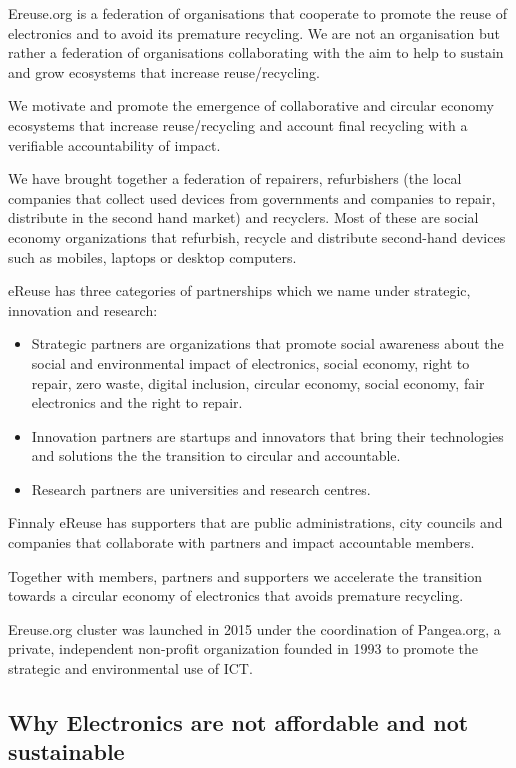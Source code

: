 \documentclass[
]{book}
\begin{document}
Ereuse.org is a federation of organisations that cooperate to promote the reuse of electronics and to avoid its premature recycling. We are not an organisation but rather a federation of organisations collaborating with the aim to help to sustain and grow ecosystems that increase reuse/recycling.

We motivate and promote the emergence of collaborative and circular economy ecosystems that increase reuse/recycling and account final recycling with a verifiable accountability of impact.

We have brought together a federation of repairers, refurbishers (the local companies that collect used devices from governments and companies to repair, distribute in the second hand market) and recyclers. Most of these are social economy organizations that refurbish, recycle and distribute second-hand devices such as mobiles, laptops or desktop computers.

eReuse has three categories of partnerships which we name under strategic, innovation and research:

\begin{itemize}
\item
  Strategic partners are organizations that promote social awareness about the social and environmental impact of electronics, social economy, right to repair, zero waste, digital inclusion, circular economy, social economy, fair electronics and the right to repair.
\item
  Innovation partners are startups and innovators that bring their technologies and solutions the the transition to circular and accountable.
\item
  Research partners are universities and research centres.
\end{itemize}

Finnaly eReuse has supporters that are public administrations, city councils and companies that collaborate with partners and impact accountable members.

Together with members, partners and supporters we accelerate the transition towards a circular economy of electronics that avoids premature recycling.

Ereuse.org cluster was launched in 2015 under the coordination of Pangea.org, a private, independent non-profit organization founded in 1993 to promote the strategic and environmental use of ICT.

\hypertarget{why-electronics-are-not-affordable-and-not-sustainable}{%
\subsection{Why Electronics are not affordable and not sustainable}\label{why-electronics-are-not-affordable-and-not-sustainable}}
\end{document}
